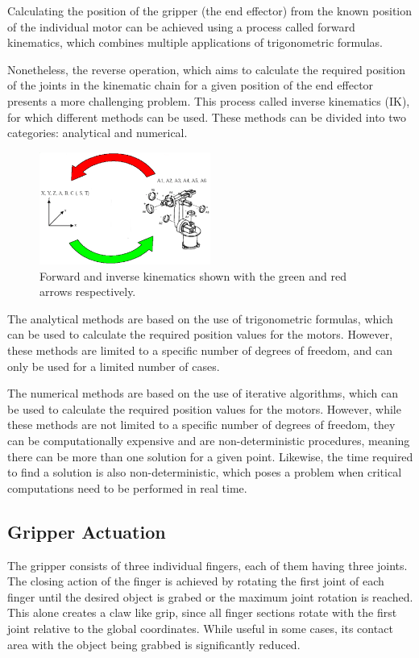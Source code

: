 Calculating the position of the gripper (the end effector) from the known position of the individual motor can be achieved using a process called forward kinematics, which combines multiple applications of trigonometric formulas.

Nonetheless, the reverse operation, which aims to calculate the required position of the joints in the kinematic chain for a given position of the end effector presents a more challenging problem. 
This process called inverse kinematics (IK), for which different methods can be used. These methods can be divided into two categories: analytical and numerical.

\begin{figure}[!h]
    \centering
    \includegraphics[width=0.5\textwidth]{Figures/fk_vs_ik.png}
    \caption{Forward and inverse kinematics shown with the green and red arrows respectively.}
    \label{fig:fkik}
\end{figure}

The analytical methods are based on the use of trigonometric formulas, which can be used to calculate the required position values for the motors. However, these methods are limited to a specific number of degrees of freedom, and can only be used for a limited number of cases.

The numerical methods are based on the use of iterative algorithms, which can be used to calculate the required position values for the motors. However, while these methods are not limited to a specific number of degrees of freedom, they can be computationally expensive and are non-deterministic procedures, meaning there can be more than one solution for a given point. Likewise, the time required to find a solution is also non-deterministic, which poses a problem when critical computations need to be performed in real time.


\subsection{Gripper Actuation}

The gripper consists of three individual fingers, each of them having three joints. The closing action of the finger is achieved by rotating the first joint of each finger until the desired object is grabed or the maximum joint rotation is reached. This alone creates a claw like grip, since all finger sections rotate with the first joint relative to the global coordinates. While useful in some cases, its contact area with the object being grabbed is significantly reduced.

